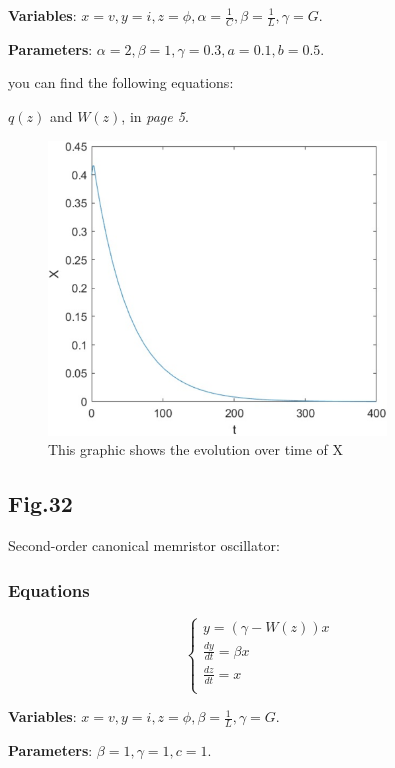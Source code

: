 \documentclass[12pt, a4paper]{paper}
\begin{document}
\textbf{Variables}: $x=v, y=i, z=\phi, \alpha=\frac{1}{C},
\beta=\frac{1}{L}, \gamma=G$.

\textbf{Parameters}: $\alpha =2, \beta =1, \gamma =0.3, a=0.1, b=0.5$.

you can find the following equations:

$q(z)$ and $W(z)$, in \textit{page 5}.

\begin{figure}[h]
\centering
\includegraphics[width=0.8\textwidth]{Fig_29.eps}
\caption{This graphic shows the evolution over time of X}
\end{figure}

\newpage
\subsection{Fig.32}
Second-order canonical memristor oscillator:
\subsubsection{Equations}
\begin{equation}
\begin{cases}
y=(\gamma-W(z))x
\\
\frac{dy}{dt}=\beta x
\\
\frac{dz}{dt}=x
\\
\end{cases}
\end{equation}

\textbf{Variables}: $x=v, y=i, z=\phi, 
\beta=\frac{1}{L}, \gamma=G$.

\textbf{Parameters}: $\beta =1, \gamma =1, c=1$.
\end{document}
